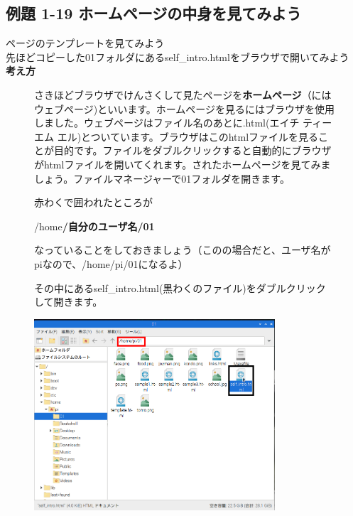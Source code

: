 \bigskip

\clearpage
\subsection{例題 1-19 ホームページの中身を見てみよう}
\noindent
{}ページのテンプレートを見てみよう\\
先ほどコピーした01フォルダにあるself\_intro.htmlをブラウザで開いてみよう\\

\textbf{考え方}

\begin{figure}[hb]
  \centering
  \begin{minipage}{16.576cm}
    さきほどブラウザでけんさくして見たページを\textbf{ホームページ}（にはウェブページ)といいます。ホームページを見るにはブラウザを使用しました。ウェブページはファイル名のあとに.html(エイチ
    ティー エム
    エル)とついています。ブラウザはこのhtmlファイルを見ることが目的です。ファイルをダブルクリックすると自動的にブラウザがhtmlファイルを開いてくれます。されたホームページを見てみましょう。ファイルマネージャーで01フォルダを開きます。

    赤わくで囲われたところが

    /home\textbf{/自分のユーザ名/01}

    なっていることをしておきましょう（このの場合だと、ユーザ名がpiなので、/home/pi/01になるよ）

    その中にあるself\_intro.html(黒わくのファイル)をダブルクリックして開きます。




    \bigskip
  \end{minipage}

  \includegraphics[width=0.8\textwidth]{text01-img/textbook-img141.png}

\end{figure}

